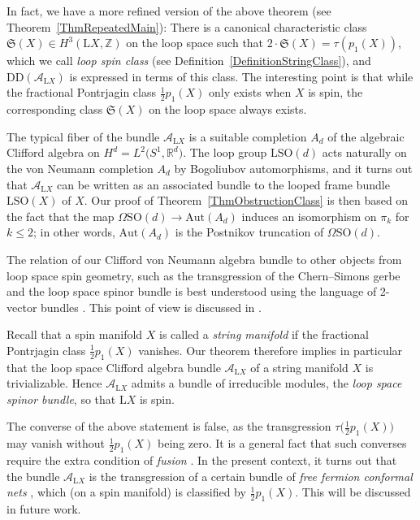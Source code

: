 \documentclass[pdftex]{sigma}
\numberwithin{equation}{section}
\newcommand{\R}{\mathbb{R}}
\newcommand{\Z}{\mathbb{Z}}
\newcommand{\SO}{\mathrm{SO}}
\newcommand{\Aut}{\mathrm{Aut}}
\renewcommand{\L}{\mathrm{L}}
\newcommand{\DD}{\mathrm{DD}}
\begin{document}
In fact, we have a more refined version of the above theorem (see Theorem~\ref{ThmRepeatedMain}):
There is a canonical characteristic class $\mathfrak{S}(X) \in H^3(\L X, \Z)$ on the loop space such that $2 \cdot \mathfrak{S}(X) = \tau(p_1(X))$, which we call \emph{loop spin class} (see Definition~\ref{DefinitionStringClass}),
and $\DD(\mathcal{A}_{\L X})$ is expressed in terms of this class.
The interesting point is that while the fractional Pontrjagin class $\frac{1}{2}p_1(X)$ only exists when $X$ is spin, the corresponding class $\mathfrak{S}(X)$ on the loop space always exists.

The typical fiber of the bundle $\mathcal{A}_{\L X}$ is a suitable completion $A_d$ of the algebraic Clifford algebra on $H^d = L^2\big(S^1, \R^d\big)$.
The loop group $\L\SO(d)$ acts naturally on the von Neumann completion $A_d$ by Bogoliubov automorphisms, and it turns out that $\mathcal{A}_{\L X}$ can be written as an associated bundle to the looped frame bundle $\L\SO(X)$ of $X$.
Our proof of Theorem~\ref{ThmObstructionClass} is then based on the fact that the map $\Omega\SO(d) \to \Aut(A_d)$ induces an isomorphism on $\pi_k$ for $k \leq 2$; in other words, $\Aut(A_d)$ is the Postnikov truncation of $\Omega\SO(d)$.



The relation of our Clifford von Neumann algebra bundle to other objects from loop space spin geometry, such as the transgression of the Chern--Simons gerbe \cite{WaldorfSpinString} and the loop space spinor bundle \cite{ KristelWaldorf2, KristelWaldorf3,KristelWaldorf1} is best understood using the language of 2-vector bundles \cite{2vectorbundles}.
This point of view is discussed in \cite[Section~1]{LudewigSpinorBundle}.

Recall that a spin manifold $X$ is called a \emph{string manifold} if the fractional Pontrjagin class $\frac{1}{2}p_1(X)$ vanishes.
Our theorem therefore implies in particular that the loop space Clifford algebra bundle $\mathcal{A}_{\L X}$ of a string manifold $X$ is trivializable.
Hence $\mathcal{A}_{\L X}$ admits a bundle of irreducible modules, the \emph{loop space spinor bundle}, so that $\L X$ is spin.

The converse of the above statement is false, as the transgression $\tau\big(\frac{1}{2}p_1(X)\big)$ may vanish without $\frac{1}{2}p_1(X)$ being zero.
It is a general fact that such converses require the extra condition of \emph{fusion} \cite{WaldorfTransgressionI, WaldorfTransgressionII, WaldorfTransgressionIII}.
In the present context, it turns out that the bundle $\mathcal{A}_{\L X}$ is the transgression of a certain bundle of \emph{free fermion conformal nets} \cite{DouglasHenriquesModularFormsConformalNets}, which (on a spin manifold) is classified by $\frac{1}{2}p_1(X)$.
This will be discussed in future work.
\end{document}
